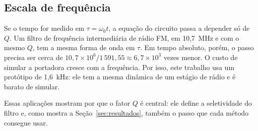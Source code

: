 \subsection{Escala de frequência}

Se o tempo for medido em \(\tau=\omega_0 t\), a equação do circuito passa a depender só de \(Q\). Um filtro de frequência intermediária de rádio FM, em 10{,}7~MHz e com o mesmo \(Q\), tem a mesma forma de onda em \(\tau\). Em tempo absoluto, porém, o passo precisa ser cerca de \(10{,}7\times 10^{6}/1\,591{,}55\approx 6{,}7\times 10^{3}\) vezes menor. O custo de simular a portadora cresce com a frequência. Por isso, este trabalho usa um protótipo de 1,6~kHz: ele tem a mesma dinâmica de um estágio de rádio e é barato de simular.

Essas aplicações mostram por que o fator \(Q\) é central: ele define a seletividade do filtro e, como mostra a Seção~\ref{sec:resultados}, também o passo que cada método consegue usar.

